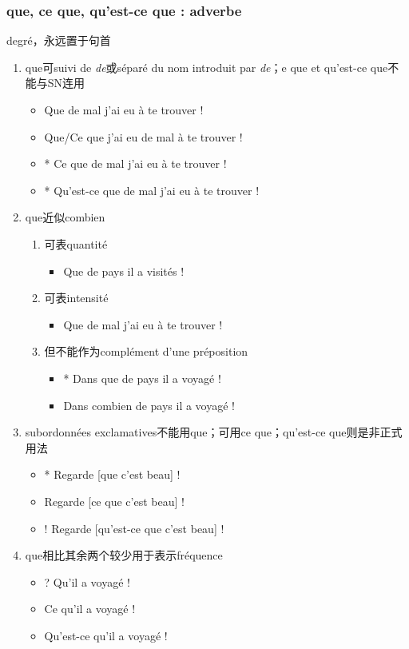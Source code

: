 \documentclass[UTF8]{report}
\begin{document}
\subsubsection{que, ce que, qu’est-ce que : adverbe}
degré，永远置于句首
\begin{enumerate}
    \item que可suivi de \textit{de}或séparé du nom introduit par \textit{de}；e que et qu’est-ce que不能与SN连用
    \begin{itemize}
        \item Que de mal j’ai eu à te trouver !
        \item Que/Ce que j’ai eu de mal à te trouver !
        \item * Ce que de mal j’ai eu à te trouver !
        \item * Qu’est-ce que de mal j’ai eu à te trouver !
    \end{itemize}
    \item que近似combien
    \begin{enumerate}
        \item 可表quantité
        \begin{itemize}
            \item Que de pays il a visités !
        \end{itemize}
        \item 可表intensité
        \begin{itemize}
            \item Que de mal j’ai eu à te trouver !
        \end{itemize}
        \item 但不能作为complément d’une préposition
        \begin{itemize}
            \item * Dans que de pays il a voyagé !
            \item Dans combien de pays il a voyagé !
        \end{itemize}
    \end{enumerate}
    \item subordonnées exclamatives不能用que；可用ce que；qu’est-ce que则是非正式用法
    \begin{itemize}
        \item * Regarde [que c’est beau] !
        \item Regarde [ce que c’est beau] !
        \item ! Regarde [qu’est-ce que c’est beau] !
    \end{itemize}
    \item que相比其余两个较少用于表示fréquence
    \begin{itemize}
        \item ? Qu’il a voyagé !
        \item Ce qu’il a voyagé !
        \item Qu’est-ce qu’il a voyagé !
    \end{itemize}
\end{enumerate}
\end{document}
